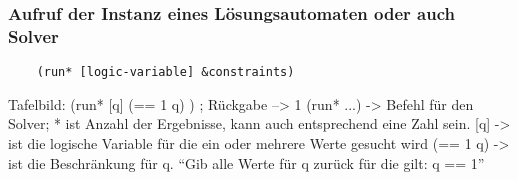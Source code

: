 \subsubsection{Aufruf der Instanz eines Lösungsautomaten oder auch Solver}

\begin{lstlisting}
    (run* [logic-variable] &constraints)
\end{lstlisting}


Tafelbild: (run* [q] (== 1 q) ) ; Rückgabe --> 1
(run* ...) -> Befehl für den Solver; * ist Anzahl der Ergebnisse, kann auch entsprechend eine Zahl sein.
[q] -> ist die logische Variable für die ein oder mehrere Werte gesucht wird
(== 1 q) -> ist die Beschränkung für q.
“Gib alle Werte für q zurück für die gilt: q == 1”